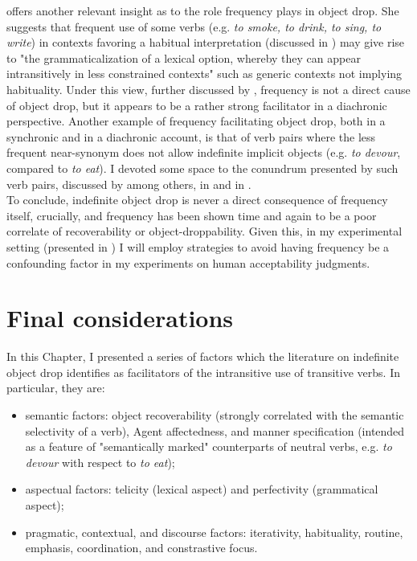 \textcite{Goldberg2005a} offers another relevant insight as to the role frequency plays in object drop. She suggests that frequent use of some verbs (e.g. \textit{to smoke, to drink, to sing, to write}) in contexts favoring a habitual interpretation (discussed in ) may give rise to "the grammaticalization of a lexical option, whereby they can appear intransitively in less constrained contexts" such as generic contexts not implying habituality. Under this view, further discussed by \textcite[65]{Lorenzetti2008}, frequency is not a direct cause of object drop, but it appears to be a rather strong facilitator in a diachronic perspective. Another example of frequency facilitating object drop, both in a synchronic and in a diachronic account, is that of verb pairs where the less frequent near-synonym does not allow indefinite implicit objects (e.g. \textit{to devour}, compared to \textit{to eat}). I devoted some space to the conundrum presented by such verb pairs, discussed by \textcite{Glass2020, Goldberg2005a, Lorenzetti2008} among others, in  and in .\\
To conclude, indefinite object drop is never a direct consequence of frequency itself, crucially, and frequency has been shown time and again to be a poor correlate of recoverability or object-droppability. Given this, in my experimental setting (presented in ) I will employ strategies to avoid having frequency be a confounding factor in my experiments on human acceptability judgments.

\section{Final considerations} 
In this Chapter, I presented a series of factors which the literature on indefinite object drop identifies as facilitators of the intransitive use of transitive verbs. In particular, they are:
\begin{itemize}
    \item semantic factors: object recoverability (strongly correlated with the semantic selectivity of a verb), Agent affectedness, and manner specification (intended as a feature of "semantically marked" counterparts of neutral verbs, e.g. \textit{to devour} with respect to \textit{to eat});
    \item aspectual factors: telicity (lexical aspect) and perfectivity (grammatical aspect);
    \item pragmatic, contextual, and discourse factors: iterativity, habituality, routine, emphasis, coordination, and constrastive focus.
\end{itemize}


